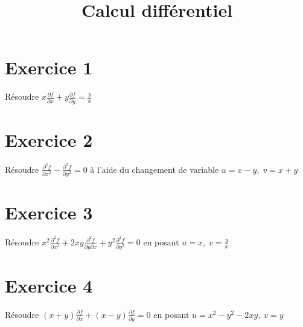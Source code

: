 \documentclass[11pt]{article}
\author{\Name \texttt{\Login}}
\date{}
\title{Calcul différentiel}
\begin{document}
\maketitle

\section*{Exercice 1}

Résoudre $ x\frac{\partial f}{\partial x}+y\frac{\partial f}{\partial y} = \frac{y}{x}$

\section*{Exercice 2}

Résoudre $ \frac{\partial ^2 f}{\partial x^2 } - \frac{\partial ^2 f}{\partial y^2 } = 0$ à l'aide du changement de variable $u=x-y,\;  v=x+y$

\section*{Exercice 3}

Résoudre $ x^2\frac{\partial ^2 f}{\partial x^2} + 2xy\frac{\partial ^2 f}{\partial y\partial x} + y^2\frac{\partial ^2 f}{\partial y^2} = 0$ en posant $u=x, \; v=\frac{y}{x}$

\section*{Exercice 4}

Résoudre $ (x+y)\frac{\partial f}{\partial x} + (x-y)\frac{\partial f}{\partial y} = 0$ en posant $u = x^2-y^2-2xy, \; v=y$
\end{document}
